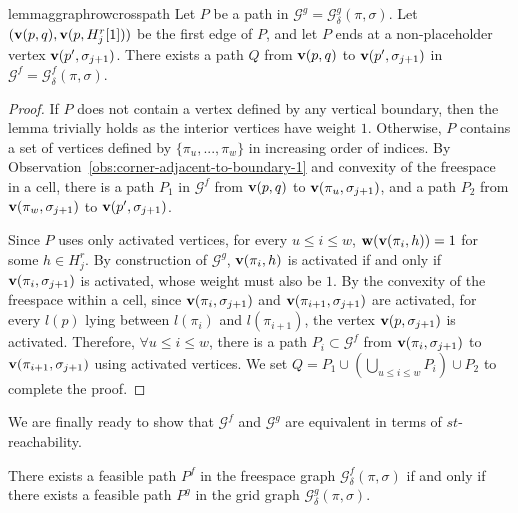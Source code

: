 \documentclass[thm-restate]{lipics-v2021}
\theoremstyle{remark}
\newcommand{\weight}[1]{\normalfont \textbf{w}(#1)}
\newcommand{\graph}[0]{\mathcal{G}}
\newcommand{\vertex}[1]{\normalfont \textbf{v}(#1)}
\newcommand{\fsgraph}[0]{\graph^{f}}
\newcommand{\ggraph}[0]{\graph^g}
\begin{document}
\begin{restatable}{lemma}{ggraphrowcrosspath} \label{lem:ggraph-placeholder-row-path}
    Let $P$ be a path in $\ggraph = \ggraph_{\delta}(\pi, \sigma)$. Let $(\vertex{p, q}, \vertex{p, H^r_j[1]})$ be the first edge of $P$, and let $P$ ends at a non-placeholder vertex $\vertex{p', \sigma_{j + 1}}$. There exists a path $Q$ from $\vertex{p, q}$ to $\vertex{p', \sigma_{j + 1}}$ in $\fsgraph = \fsgraph_{\delta}(\pi, \sigma)$.  
\end{restatable}
\begin{proof}
    If $P$ does not contain a vertex defined by any vertical boundary, then the lemma trivially holds as the interior vertices have weight $1$. Otherwise, $P$ contains a set of vertices defined by $\{\pi_u, ..., \pi_w\}$ in increasing order of indices. By Observation~\ref{obs:corner-adjacent-to-boundary-1} and convexity of the freespace in a cell, there is a path $P_1$ in $\fsgraph$ from $\vertex{p, q}$ to $\vertex{\pi_u, \sigma_{j + 1}}$, and a path $P_2$ from $\vertex{\pi_w, \sigma_{j + 1}}$ to $\vertex{p', \sigma_{j + 1}}$. 
    
    Since $P$ uses only activated vertices, for every $u \leq i \leq w$, $\weight{\vertex{\pi_i, h}} = 1$ for some $h \in H^r_j$. By construction of $\ggraph$, $\vertex{\pi_i, h}$ is activated if and only if $\vertex{\pi_i, \sigma_{j + 1}}$ is activated, whose weight must also be $1$. By the convexity of the freespace within a cell, since $\vertex{\pi_i, \sigma_{j + 1}}$ and $\vertex{\pi_{i + 1}, \sigma_{j + 1}}$ are activated, for every $l(p)$ lying between $l(\pi_i)$ and $l(\pi_{i + 1})$, the vertex $\vertex{p, \sigma_{j + 1}}$ is activated. Therefore, $\forall u \leq i \leq w$, there is a path $P_i \subset \fsgraph$ from $\vertex{\pi_i, \sigma_{j + 1}}$ to $\vertex{\pi_{i + 1}, \sigma_{j + 1}}$ using activated vertices. We set $Q = P_1 \cup (\bigcup_{u \leq i \leq w} P_i) \cup P_2$ to complete the proof. 
\end{proof}

We are finally ready to show that $\fsgraph$ and $\ggraph$ are equivalent in terms of $st$-reachability. 
\begin{lemma} \label{lem:fs-gg-path-equivalent}
    There exists a feasible path $P^f$ in the freespace graph $\fsgraph_\delta(\pi, \sigma)$ if and only if there exists a feasible path $P^g$ in the grid graph $\ggraph_\delta(\pi, \sigma)$. 
\end{lemma}
\end{document}
